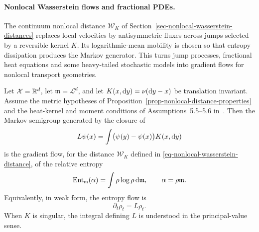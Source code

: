 \paragraph{Nonlocal Wasserstein flows and fractional PDEs.}

The continuum nonlocal distance \(\mathcal W_K\) of Section~\ref{sec-nonlocal-wasserstein-distances} replaces local velocities by antisymmetric fluxes across jumps selected by a reversible kernel \(K\). Its logarithmic-mean mobility is chosen so that entropy dissipation produces the Markov generator. This turns jump processes, fractional heat equations and some heavy-tailed stochastic models into gradient flows for nonlocal transport geometries.

\begin{prop}\label{prop-nonlocal-entropy-gradient-flow}
	Let $\mathcal X=\mathbb{R}^d$, let $\mathfrak m=\mathcal L^d$, and let $K(x,\mathrm{d} y)=\nu(\mathrm{d} y-x)$ be translation invariant. Assume the metric hypotheses of Proposition~\ref{prop-nonlocal-distance-properties} and the heat-kernel and moment conditions of Assumptions~5.5--5.6 in~\cite{Erbar2012JumpEntropy}. Then the Markov semigroup generated by the closure of
	\[
		L\psi(x)
		=
		\int\bigl(\psi(y)-\psi(x)\bigr)K(x,\mathrm{d} y)
	\]
	is the gradient flow, for the distance \(\mathcal W_K\) defined in \eqref{eq-nonlocal-wasserstein-distance}, of the relative entropy
	\[
		\mathrm{Ent}_{\mathfrak m}(\alpha)
		=
		\int \rho\log\rho\,\mathrm{d}\mathfrak m,
		\qquad
		\alpha=\rho\mathfrak m.
	\]
	Equivalently, in weak form, the entropy flow is
	\begin{equation}\label{eq-nonlocal-entropy-flow}
		\partial_t\rho_t=L\rho_t.
	\end{equation}
	When \(K\) is singular, the integral defining \(L\) is understood in the principal-value sense.
\end{prop}


